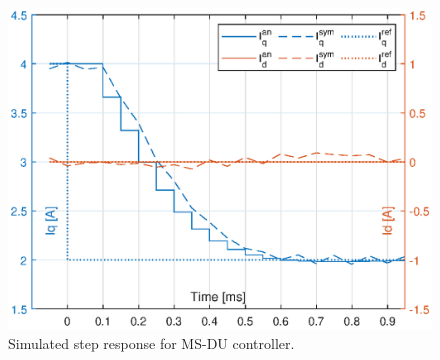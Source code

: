 \documentclass[journal]{IEEEtran}
\begin{document}
\begin{figure}[t!]
    \centerline{\includegraphics[width=0.95\linewidth]{figures/MSDU_step.eps}}
    \caption{Simulated step response for MS-DU controller.}
    \label{fig:MSDU_step} 
\end{figure}
\end{document}
